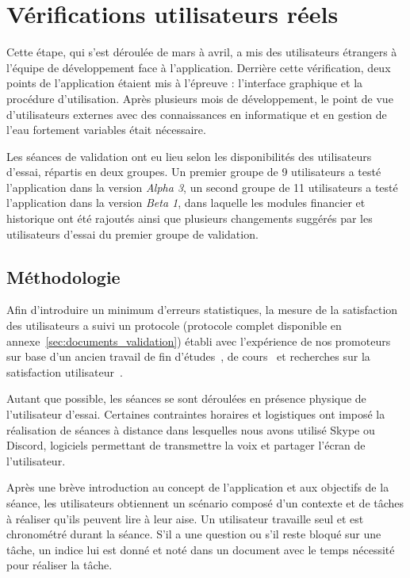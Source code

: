 \documentclass{EPL-master-thesis-covers-FR}
\begin{document}
		\section{Vérifications utilisateurs réels}
			Cette étape, qui s'est déroulée de mars à avril, a mis des utilisateurs étrangers à l'équipe de développement face à l'application. Derrière cette vérification, deux points de l'application étaient mis à l'épreuve : l'interface graphique et la procédure d'utilisation. Après plusieurs mois de développement, le point de vue d'utilisateurs externes avec des connaissances en informatique et en gestion de l'eau fortement variables était nécessaire.

			Les séances de validation ont eu lieu selon les disponibilités des utilisateurs d'essai, répartis en deux groupes. Un premier groupe de 9 utilisateurs a testé l'application dans la version \emph{Alpha 3}, un second groupe de 11 utilisateurs a testé l'application dans la version \emph{Beta 1}, dans laquelle les modules financier et historique ont été rajoutés ainsi que plusieurs changements suggérés par les utilisateurs d'essai du premier groupe de validation.

			\subsection*{Méthodologie}

				Afin d'introduire un minimum d'erreurs statistiques, la mesure de la satisfaction des utilisateurs a suivi un protocole (protocole complet disponible en annexe~\ref{sec:documents_validation}) établi avec l'expérience de nos promoteurs sur base d'un ancien travail de fin d'études~\cite{ref:reflecton}, de cours~\cite{ref:vanderdonckt_hci, ref:vanderdonckt_cscw} et recherches sur la satisfaction utilisateur~\cite{ref:usability_evaluation_tools, ref:ssi}.

				Autant que possible, les séances se sont déroulées en présence physique de l'utilisateur d'essai. Certaines contraintes horaires et logistiques ont imposé la réalisation de séances à distance dans lesquelles nous avons utilisé Skype ou Discord, logiciels permettant de transmettre la voix et partager l'écran de l'utilisateur.

				Après une brève introduction au concept de l'application et aux objectifs de la séance, les utilisateurs obtiennent un scénario composé d'un contexte et de tâches à réaliser qu'ils peuvent lire à leur aise. Un utilisateur travaille seul et est chronométré durant la séance. S'il a une question ou s'il reste bloqué sur une tâche, un indice lui est donné et noté dans un document avec le temps nécessité pour réaliser la tâche.
\end{document}
